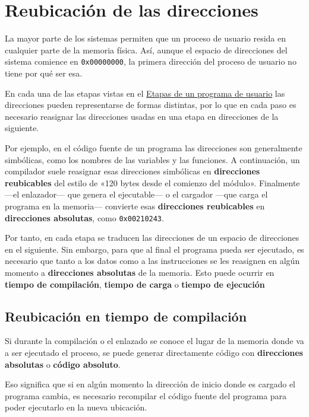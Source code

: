 \section{Reubicación de las
direcciones}\label{_reubicaciuxf3n_de_las_direcciones}

La mayor parte de los sistemas permiten que un proceso de usuario resida
en cualquier parte de la memoria física. Así, aunque el espacio de
direcciones del sistema comience en \texttt{0x00000000}, la primera
dirección del proceso de usuario no tiene por qué ser esa.

En cada una de las etapas vistas en el
\hyperref[_etapas_de_un_programa_de_usuario]{Etapas de un programa de
usuario} las direcciones pueden representarse de formas distintas, por
lo que en cada paso es necesario reasignar las direcciones usadas en una
etapa en direcciones de la siguiente.

Por ejemplo, en el código fuente de un programa las direcciones son
generalmente simbólicas, como los nombres de las variables y las
funciones. A continuación, un compilador suele reasignar esas
direcciones simbólicas en \textbf{direcciones reubicables}{} del estilo
de «120 bytes desde el comienzo del módulo». Finalmente ---el
enlazador--- que genera el ejecutable--- o el cargador ---que carga el
programa en la memoria--- convierte esas \textbf{direcciones
reubicables} en \textbf{direcciones absolutas}{}, como
\texttt{0x00210243}.

Por tanto, en cada etapa se traducen las direcciones de un espacio de
direcciones en el siguiente. Sin embargo, para que al final el programa
pueda ser ejecutado, es necesario que tanto a los datos como a las
instrucciones se les reasignen en algún momento a \textbf{direcciones
absolutas} de la memoria. Esto puede ocurrir en \textbf{tiempo de
compilación}, \textbf{tiempo de carga} o \textbf{tiempo de ejecución}

\subsection{Reubicación en tiempo de
compilación}\label{_reubicaciuxf3n_en_tiempo_de_compilaciuxf3n}

Si durante la compilación o el enlazado se conoce el lugar de la memoria
donde va a ser ejecutado el proceso, se puede generar directamente
código con \textbf{direcciones absolutas} o \textbf{código absoluto}{}.

Eso significa que si en algún momento la dirección de inicio donde es
cargado el programa cambia, es necesario recompilar el código fuente del
programa para poder ejecutarlo en la nueva ubicación.

